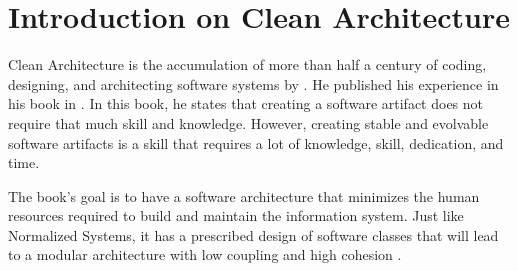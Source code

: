 \section{Introduction on Clean Architecture} \label{sec:into_ca}

Clean Architecture is the accumulation of more than half a century of coding, designing,
and architecting software systems by \citeauthor*[]{martin_clean_2018}. He published his
experience in his book  in \citeyear[]{martin_clean_2018}.
In this book, he states that creating a software artifact does not require that much skill
and knowledge. However, creating stable and evolvable software artifacts is a skill that
requires a lot of knowledge, skill, dedication, and time.

The book's goal is to have a software architecture that minimizes the human resources
required to build and maintain the information system. Just like Normalized Systems, it
has a prescribed design of software classes that will lead to a modular architecture with
low coupling and high cohesion \parencite{martin_clean_2018}.
